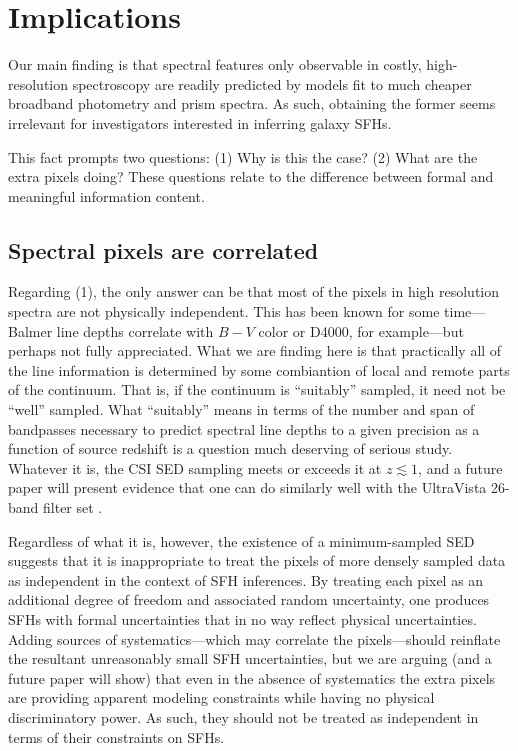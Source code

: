 \documentclass[a4paper,fleqn,usenatbib]{mnras}
\begin{document}
\section{Implications}
\label{sec:discussion}

Our main finding is that spectral features only observable in costly, high-resolution spectroscopy
are readily predicted by models fit to much cheaper broadband photometry and prism spectra. As
such, obtaining the former seems irrelevant for investigators interested in inferring galaxy SFHs.

This fact prompts two questions: (1) Why is this the case? (2) What are the extra pixels doing?
These questions relate to the difference between formal and meaningful information content.

\subsection{Spectral pixels are correlated}
\label{sec:pixels}

Regarding (1), the only answer can be that most of the pixels in high resolution spectra are
not physically independent. This has been known for some time---Balmer line depths correlate
with $B-V$ color or D4000, for example---but perhaps not fully appreciated. What we are
finding here is that practically all of the line information is determined by some combiantion
of local and remote parts of the continuum. That is, if the continuum is ``suitably'' sampled,
it need not be ``well'' sampled. What ``suitably'' means in terms of the number and span
of bandpasses necessary to predict spectral line depths to a given precision as a function of
source redshift is a question much deserving of serious study. Whatever it is, the CSI SED 
sampling meets or exceeds it at $z\lesssim1$, and a future paper will present evidence
that one can do similarly well with the UltraVista 26-band filter set \citep{Muzzin13}.

Regardless of what it is, however, the existence of a minimum-sampled SED suggests that 
it is inappropriate to treat the pixels of more densely sampled data as independent in the
context of SFH inferences. By treating each pixel as an additional degree of freedom and
associated random uncertainty, one produces SFHs with formal uncertainties that in
no way reflect physical uncertainties. Adding sources of systematics---which may correlate
the pixels---should reinflate the resultant unreasonably small SFH uncertainties, but we
are arguing (and a future paper will show) that even in the absence of systematics the
extra pixels are providing apparent modeling constraints while having no physical
discriminatory power. As such, they should not be treated as independent in terms of their
constraints on SFHs.
\end{document}
